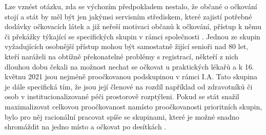 Lze vznést otázku, zda se výchozím předpokladem nestalo, že občané o očkování stojí a stát by měl být jen jakýmsi servisním střediskem, které zajistí potřebné dodávky očkovacích látek a již neřeší motivaci občanů k očkování, přístup k němu \cite{logoc_zpozdeni} či překážky týkající se specifických skupin v rámci společnosti \cite{logoc_skvrny,logoc_romove}. %
Jednou ze skupin vyžadujících osobnější přístup mohou být samostatně žijící senioři nad 80 let, kteří naráželi na obtížně překonatelné problémy s registrací, někteří z nich dlouhou dobu čekali na možnost nechat se očkovat u praktických lékařů a k 16. květnu 2021 jsou nejméně proočkovanou podskupinou v rámci I.A. Tato skupina je dále specifická tím, že jsou její členové na rozdíl například od zdravotníků či osob v institucionalizované péči prostorově rozptýleni. Pokud se stát snažil maximalizovat celkovou proočkovanost namísto proočkovanosti prioritních skupin, bylo pro něj racionální pracovat spíše se skupinami, které je možné snadno shromáždit na jedno místo a očkovat po desítkách \cite{blog_ucitele}.  %









